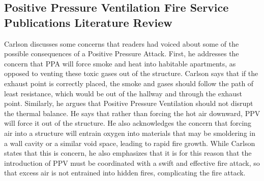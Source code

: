 \documentclass{article}
\begin{document}
\begin{appendices}
\subsection{Positive Pressure Ventilation Fire Service Publications Literature Review} \label{app:FireServicePublicationsLiteratureReview}
\normalsize
Carlson discusses some concerns that readers had voiced about some of the possible consequences of a Positive Pressure Attack. First, he addresses the concern that PPA will force smoke and heat into habitable apartments, as opposed to venting these toxic gases out of the structure. Carlson says that if the exhaust point is correctly placed, the smoke and gases should follow the path of least resistance, which would be out of the hallway and through the exhaust point. Similarly, he argues that Positive Pressure Ventilation should not disrupt the thermal balance. He says that rather than forcing the hot air downward, PPV will force it out of the structure. He also acknowledges the concern that forcing air into a structure will entrain oxygen into materials that may be smoldering in a wall cavity or a similar void space, leading to rapid fire growth. While Carlson states that this is concern, he also emphasizes that it is for this reason that the introduction of PPV must be coordinated with a swift and effective fire attack, so that excess air is not entrained into hidden fires, complicating the fire attack.\cite{CarlsonFE}


\end{appendices}
\end{document}
